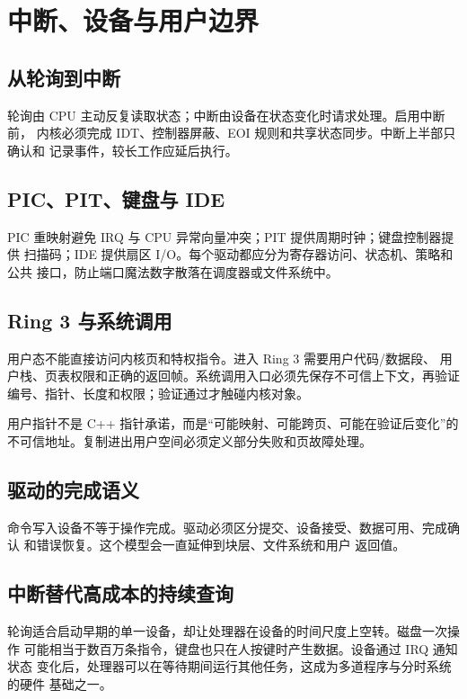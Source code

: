\chapter{中断、设备与用户边界}

\section{从轮询到中断}

轮询由 CPU 主动反复读取状态；中断由设备在状态变化时请求处理。启用中断前，
内核必须完成 IDT、控制器屏蔽、EOI 规则和共享状态同步。中断上半部只确认和
记录事件，较长工作应延后执行。

\section{PIC、PIT、键盘与 IDE}

PIC 重映射避免 IRQ 与 CPU 异常向量冲突；PIT 提供周期时钟；键盘控制器提供
扫描码；IDE 提供扇区 I/O。每个驱动都应分为寄存器访问、状态机、策略和公共
接口，防止端口魔法数字散落在调度器或文件系统中。

\section{Ring 3 与系统调用}

用户态不能直接访问内核页和特权指令。进入 Ring 3 需要用户代码/数据段、
用户栈、页表权限和正确的返回帧。系统调用入口必须先保存不可信上下文，再验证
编号、指针、长度和权限；验证通过才触碰内核对象。

\begin{contractbox}
用户指针不是 C++ 指针承诺，而是“可能映射、可能跨页、可能在验证后变化”的
不可信地址。复制进出用户空间必须定义部分失败和页故障处理。
\end{contractbox}

\section{驱动的完成语义}

命令写入设备不等于操作完成。驱动必须区分提交、设备接受、数据可用、完成确认
和错误恢复。这个模型会一直延伸到块层、文件系统和用户  返回值。

\section{中断替代高成本的持续查询}

轮询适合启动早期的单一设备，却让处理器在设备的时间尺度上空转。磁盘一次操作
可能相当于数百万条指令，键盘也只在人按键时产生数据。设备通过 IRQ 通知状态
变化后，处理器可以在等待期间运行其他任务，这成为多道程序与分时系统的硬件
基础之一。

